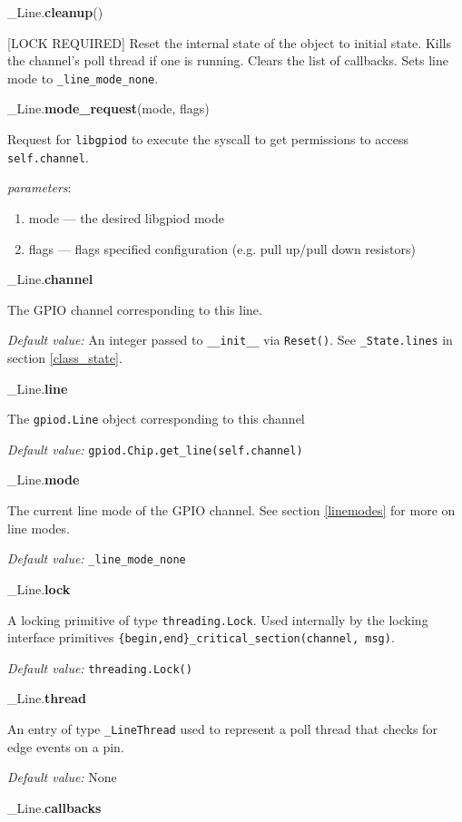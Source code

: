 \documentclass[12pt]{article}
\begin{document}
\noindent \_Line.\textbf{cleanup}()
      
[LOCK REQUIRED] Reset the internal state of the object to initial state. Kills the channel's poll thread if one is running. Clears the list of callbacks. Sets line mode to \texttt{\_line\_mode\_none}.

\noindent \_Line.\textbf{mode\_request}(mode, flags)

Request for \texttt{libgpiod} to execute the syscall to get permissions to access \texttt{self.channel}.

\textit{parameters}:
\begin{enumerate}
        \item mode --- the desired libgpiod mode
        \item flags --- flags specified configuration (e.g. pull up/pull down resistors)
\end{enumerate}

\noindent \_Line.\textbf{channel}

The GPIO channel corresponding to this line.

\textit{Default value:} An integer passed to \texttt{\_\_init\_\_} via \texttt{Reset()}. See \texttt{\_State.lines} in section \ref{class_state}.

\noindent \_Line.\textbf{line}

The \texttt{gpiod.Line} object corresponding to this channel

\textit{Default value:} \texttt{gpiod.Chip.get\_line(self.channel)}

\noindent \_Line.\textbf{mode}

The current line mode of the GPIO channel. See section \ref{linemodes} for more on line modes.

\textit{Default value:} \texttt{\_line\_mode\_none}

\noindent \_Line.\textbf{lock}

A locking primitive of type \texttt{threading.Lock}. Used internally by the locking interface primitives \texttt{\{begin,end\}\_critical\_section(channel, msg)}.

\textit{Default value:} \texttt{threading.Lock()}

\noindent \_Line.\textbf{thread}

An entry of type \texttt{\_LineThread} used to represent a poll thread that checks for edge events on a pin.

\textit{Default value:} None

\noindent \_Line.\textbf{callbacks}
\end{document}
